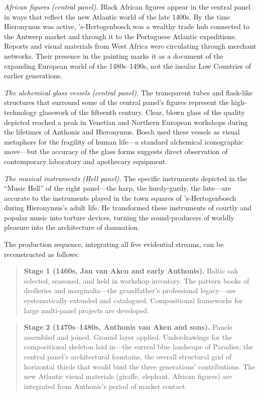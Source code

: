 \medskip

\textit{African figures (central panel).}  Black African figures appear in
the central panel in ways that reflect the new Atlantic world of the late
1400s.  By the time Hieronymus was active, 's-Hertogenbosch was a wealthy
trade hub connected to the Antwerp market and through it to the Portuguese
Atlantic expeditions.  Reports and visual materials from West Africa were
circulating through merchant networks.  Their presence in the painting
marks it as a document of the expanding European world of the 1480s--1490s,
not the insular Low Countries of earlier generations.

\medskip

\textit{The alchemical glass vessels (central panel).}  The transparent
tubes and flask-like structures that surround some of the central panel's
figures represent the high-technology glasswork of the fifteenth century.
Clear, blown glass of the quality depicted reached a peak in Venetian and
Northern European workshops during the lifetimes of Anthonis and
Hieronymus.  Bosch used these vessels as visual metaphors for the
fragility of human life---a standard alchemical iconographic move---but the
accuracy of the glass forms suggests direct observation of contemporary
laboratory and apothecary equipment.

\medskip

\textit{The musical instruments (Hell panel).}  The specific instruments
depicted in the ``Music Hell'' of the right panel---the harp, the hurdy-gurdy,
the lute---are accurate to the instruments played in the town squares of
's-Hertogenbosch during Hieronymus's adult life.  He transformed these
instruments of courtly and popular music into torture devices, turning the
sound-producers of worldly pleasure into the architecture of damnation.

\bigskip

The production sequence, integrating all five evidential streams, can be
reconstructed as follows:

\medskip
\begin{quote}
\textbf{Stage 1 (1460s, Jan van Aken and early Anthonis).}  Baltic oak
selected, seasoned, and held in workshop inventory.  The pattern books of
drolleries and marginalia---the grandfather's professional legacy---are
systematically extended and catalogued.  Compositional frameworks for large
multi-panel projects are developed.
\end{quote}

\begin{quote}
\textbf{Stage 2 (1470s--1480s, Anthonis van Aken and sons).}  Panels
assembled and joined.  Ground layer applied.  Underdrawings for the
compositional skeleton laid in---the surreal blue landscape of Paradise, the
central panel's architectural fountains, the overall structural grid of
horizontal thirds that would bind the three generations' contributions.
The new Atlantic visual materials (giraffe, elephant, African figures)
are integrated from Anthonis's period of market contact.
\end{quote}

